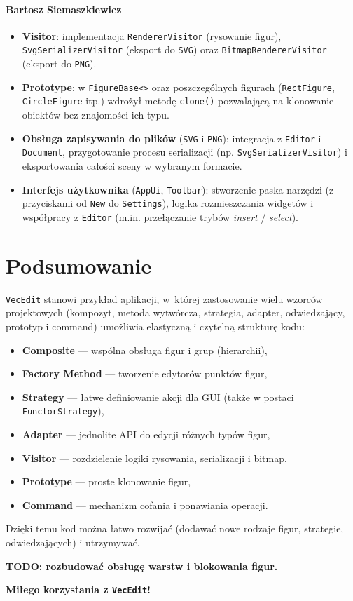 \documentclass[a4paper,12pt]{article}
\begin{document}
\paragraph{Bartosz Siemaszkiewicz}
\begin{itemize}
    \item \textbf{Visitor}: implementacja \texttt{RendererVisitor} (rysowanie figur), \texttt{SvgSerializerVisitor} (eksport do \texttt{SVG}) oraz \texttt{BitmapRendererVisitor} (eksport do \texttt{PNG}).
    \item \textbf{Prototype}: w \texttt{FigureBase<>} oraz poszczególnych figurach (\texttt{RectFigure}, \texttt{CircleFigure} itp.) wdrożył metodę \texttt{clone()} pozwalającą na klonowanie obiektów bez znajomości ich typu.
    \item \textbf{Obsługa zapisywania do plików} (\texttt{SVG} i \texttt{PNG}): integracja z \texttt{Editor} i \texttt{Document}, przygotowanie procesu serializacji (np. \texttt{SvgSerializerVisitor}) i eksportowania całości sceny w wybranym formacie.
    \item \textbf{Interfejs użytkownika} (\texttt{AppUi}, \texttt{Toolbar}): stworzenie paska narzędzi (z przyciskami od \texttt{New} do \texttt{Settings}), logika rozmieszczania widgetów i współpracy z \texttt{Editor} (m.in. przełączanie trybów \emph{insert} / \emph{select}).
\end{itemize}

\section{Podsumowanie}
\texttt{VecEdit} stanowi przykład aplikacji, w~której zastosowanie wielu wzorców
projektowych (kompozyt, metoda wytwórcza, strategia, adapter, odwiedzający,
prototyp i command) umożliwia elastyczną i czytelną strukturę kodu:
\begin{itemize}
    \item \textbf{Composite} — wspólna obsługa figur i grup (hierarchii),
    \item \textbf{Factory Method} — tworzenie edytorów punktów figur,
    \item \textbf{Strategy} — łatwe definiowanie akcji dla GUI (także w postaci \texttt{FunctorStrategy}),
    \item \textbf{Adapter} — jednolite API do edycji różnych typów figur,
    \item \textbf{Visitor} — rozdzielenie logiki rysowania, serializacji i bitmap,
    \item \textbf{Prototype} — proste klonowanie figur,
    \item \textbf{Command} — mechanizm cofania i ponawiania operacji.
\end{itemize}

Dzięki temu kod można łatwo rozwijać (dodawać nowe rodzaje figur, strategie, odwiedzających) 
i utrzymywać.

\textbf{TODO: rozbudować obsługę warstw i blokowania figur.}

\vspace{1em}
\noindent
\textbf{Miłego korzystania z \texttt{VecEdit}!}
\end{document}
